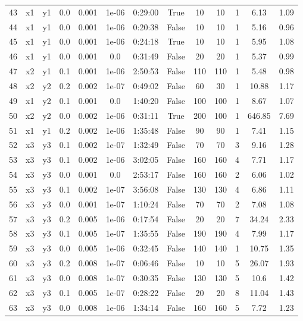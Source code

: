 \begin{longtable}{c | c | c | c | c | c | c | c | c | c | c | c | c}
43 & x1 & y1 & 0.0 & 0.001 & 1e-06 & 0:29:00 & True & 10 & 10 & 1 & 6.13 & 1.09 \\
44 & x1 & y1 & 0.0 & 0.001 & 1e-06 & 0:20:38 & False & 10 & 10 & 1 & 5.16 & 0.96 \\
45 & x1 & y1 & 0.0 & 0.001 & 1e-06 & 0:24:18 & True & 10 & 10 & 1 & 5.95 & 1.08 \\
46 & x1 & y1 & 0.0 & 0.001 & 0.0 & 0:31:49 & False & 20 & 20 & 1 & 5.37 & 0.99 \\
47 & x2 & y1 & 0.1 & 0.001 & 1e-06 & 2:50:53 & False & 110 & 110 & 1 & 5.48 & 0.98 \\
48 & x2 & y2 & 0.2 & 0.002 & 1e-07 & 0:49:02 & False & 60 & 30 & 1 & 10.88 & 1.17 \\
49 & x1 & y2 & 0.1 & 0.001 & 0.0 & 1:40:20 & False & 100 & 100 & 1 & 8.67 & 1.07 \\
50 & x2 & y2 & 0.0 & 0.002 & 1e-06 & 0:31:11 & True & 200 & 100 & 1 & 646.85 & 7.69 \\
51 & x1 & y1 & 0.2 & 0.002 & 1e-06 & 1:35:48 & False & 90 & 90 & 1 & 7.41 & 1.15 \\
52 & x3 & y3 & 0.1 & 0.002 & 1e-07 & 1:32:49 & False & 70 & 70 & 3 & 9.16 & 1.28 \\
53 & x3 & y3 & 0.1 & 0.002 & 1e-06 & 3:02:05 & False & 160 & 160 & 4 & 7.71 & 1.17 \\
54 & x3 & y3 & 0.0 & 0.001 & 0.0 & 2:53:17 & False & 160 & 160 & 2 & 6.06 & 1.02 \\
55 & x3 & y3 & 0.1 & 0.002 & 1e-07 & 3:56:08 & False & 130 & 130 & 4 & 6.86 & 1.11 \\
56 & x3 & y3 & 0.0 & 0.001 & 1e-07 & 1:10:24 & False & 70 & 70 & 2 & 7.08 & 1.08 \\
57 & x3 & y3 & 0.2 & 0.005 & 1e-06 & 0:17:54 & False & 20 & 20 & 7 & 34.24 & 2.33 \\
58 & x3 & y3 & 0.1 & 0.005 & 1e-07 & 1:35:55 & False & 190 & 190 & 4 & 7.99 & 1.17 \\
59 & x3 & y3 & 0.0 & 0.005 & 1e-06 & 0:32:45 & False & 140 & 140 & 1 & 10.75 & 1.35 \\
60 & x3 & y3 & 0.2 & 0.008 & 1e-07 & 0:06:46 & False & 10 & 10 & 5 & 26.07 & 1.93 \\
61 & x3 & y3 & 0.0 & 0.008 & 1e-07 & 0:30:35 & False & 130 & 130 & 5 & 10.6 & 1.42 \\
62 & x3 & y3 & 0.1 & 0.005 & 1e-07 & 0:28:22 & False & 20 & 20 & 8 & 11.04 & 1.43 \\
63 & x3 & y3 & 0.0 & 0.008 & 1e-06 & 1:34:14 & False & 160 & 160 & 5 & 7.72 & 1.23 \\

\end{longtable}
